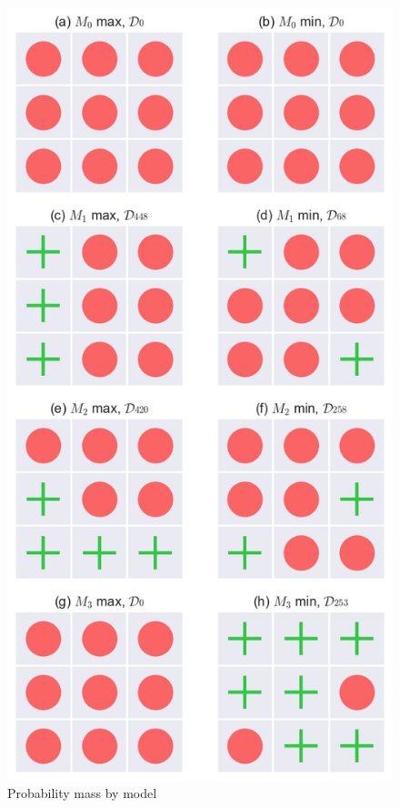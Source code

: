 \documentclass[12pt]{article}
\newenvironment{question}[2][Question]{\begin{trivlist}
\kern10pt
\item[\hskip \labelsep {\bfseries #1}\hskip \labelsep {\bfseries #2.}]}{\end{trivlist}}
\begin{document}
\begin{question}{28}
\begin{figure}
\includegraphics[scale=.7]{max_min}
\centering
\caption{Probability mass by model}
\label{max_min}
\end{figure}
\end{question}
\end{document}
